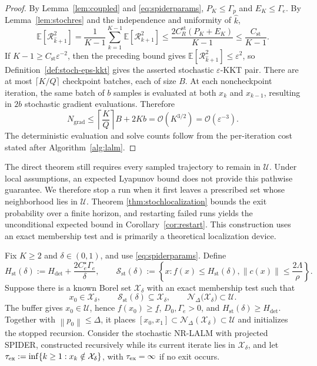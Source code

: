 \documentclass[11pt]{article}
\theoremstyle{definition}
\theoremstyle{remark}
\numberwithin{equation}{section}
\numberwithin{figure}{section}
\numberwithin{table}{section}
\numberwithin{algorithm}{section}
\newcommand{\E}{\mathbb{E}}
\newcommand{\cO}{\mathcal{O}}
\newcommand{\eps}{\varepsilon}
\newcommand{\norm}[1]{\left\lVert #1\right\rVert}
\begin{document}
\begin{proof}
By Lemma~\ref{lem:coupled} and \eqref{eq:spiderparams},
\(P_K\le\Gamma_p\) and \(E_K\le\Gamma_e\).
By Lemma~\ref{lem:stochres} and the independence and uniformity of \(\widehat{k}\),
\begin{equation*}
    \E[\mathcal R_{\widehat{k}+1}^2]
    =\frac1{K-1}\sum_{k=1}^{K-1}\E[\mathcal R_{k+1}^2]
    \le\frac{2C_R^{\mathrm{st}}(P_K+E_K)}{K-1}
    \le\frac{C_{\mathrm{st}}}{K-1}.
\end{equation*}
If \(K-1\ge C_{\mathrm{st}}\eps^{-2}\), then the preceding bound gives \(\E[\mathcal R_{\widehat{k}+1}^2]\le\eps^2\), so
Definition~\ref{def:stoch-eps-kkt} gives the asserted stochastic \(\eps\)-KKT pair. There are at most \(\lceil K/Q\rceil\) checkpoint
batches, each of size \(B\).  At each noncheckpoint iteration, the same batch of \(b\) samples is evaluated at both \(x_k\) and \(x_{k-1}\), resulting in \(2b\) stochastic gradient evaluations.  Therefore
$$
    N_{\mathrm{grad}}
    \le \left\lceil\frac KQ\right\rceil B+2Kb
    =\cO(K^{3/2})=\cO(\eps^{-3}).
$$
The deterministic evaluation and solve counts follow from the per-iteration cost stated after Algorithm~\ref{alg:lalm}.
\end{proof}

The direct theorem still requires every sampled trajectory to remain in \(\mathcal U\).  Under local assumptions, an expected Lyapunov bound does not provide this pathwise guarantee.  We therefore stop a run when it first leaves a prescribed set whose neighborhood lies in \(\mathcal U\).  Theorem \ref{thm:stochlocalization} bounds the exit probability over a finite horizon, and restarting failed runs yields the unconditional expected bound in Corollary~\ref{cor:restart}.  This construction uses an exact membership test and is primarily a theoretical localization device.

Fix \(K\ge2\) and \(\delta\in(0,1)\), and use
\eqref{eq:spiderparams}.  Define
$$
    H_{\mathrm{st}}(\delta)
    :=H_{\mathrm{det}}+\frac{2C_e^\star\Gamma_e}{\delta},
    \qquad
    \mathcal S_{\mathrm{st}}(\delta)
    :=\left\{x:f(x)\le H_{\mathrm{st}}(\delta),
       \norm{c(x)}\le\frac{2\Lambda}{\rho}\right\}.
$$
Suppose there is a known Borel set $\mathcal X_\delta$ with an exact
membership test such that
\begin{equation}
    x_0\in\mathcal X_\delta,
    \qquad
    \mathcal S_{\mathrm{st}}(\delta)
    \subseteq\mathcal X_\delta,
    \qquad
    \mathcal N_{\Delta}
       \big(\mathcal X_\delta\big)
    \subset\mathcal U.
    \label{eq:stochbuffer}
\end{equation}
The buffer gives \(x_0\in\mathcal U\), hence \(f(x_0)\ge\underline f\),
\(D_0,\Gamma_e>0\), and \(H_{\mathrm{st}}(\delta)\ge H_{\mathrm{det}}\).
Together with \(\norm{p_0}\le\Delta\), it places
\([x_0,x_1]\subset\mathcal N_\Delta(\mathcal X_\delta)\subset\mathcal U\)
and initializes the stopped recursion.
Consider the stochastic NR-LALM with projected SPIDER, constructed recursively
while its current iterate lies in \(\mathcal X_\delta\), and let
\(\tau_{\rm ex}:=\inf\{k\ge1:x_k\notin\mathcal X_\delta\}\), with
\(\tau_{\rm ex}=\infty\) if no exit occurs.
\end{document}
